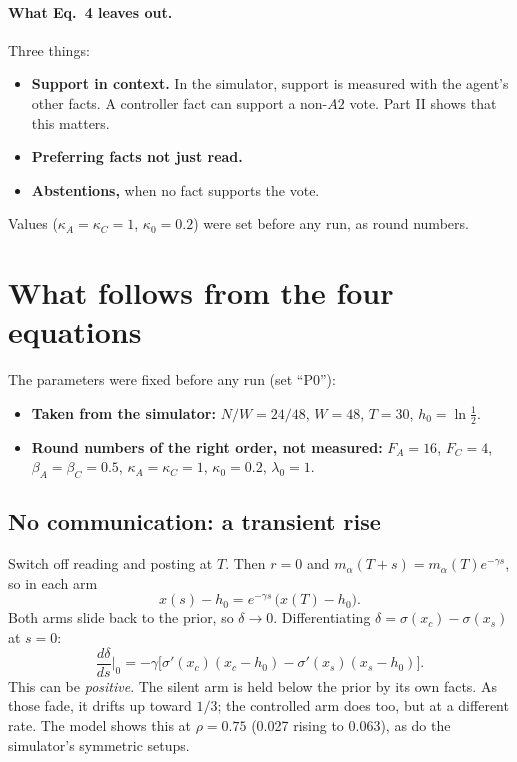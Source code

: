 \documentclass[10pt,a4paper]{article}
\begin{document}
\paragraph{What Eq.~4 leaves out.} Three things:
\begin{itemize}
\item \textbf{Support in context.} In the simulator, support is measured with the agent's other facts. A controller
  fact can support a non-$A2$ vote. Part II shows that this matters.
\item \textbf{Preferring facts not just read.}
\item \textbf{Abstentions,} when no fact supports the vote.
\end{itemize}
Values ($\kappa_A=\kappa_C=1$, $\kappa_0=0.2$) were set before any run, as round numbers.

\section{What follows from the four equations}
\label{sec:derived}
The parameters were fixed before any run (set ``P0''):
\begin{itemize}
\item \textbf{Taken from the simulator:} $N/W=24/48$, $W=48$, $T=30$, $h_0=\ln\frac12$.
\item \textbf{Round numbers of the right order, not measured:} $F_A=16$, $F_C=4$, $\beta_A=\beta_C=0.5$,
  $\kappa_A=\kappa_C=1$, $\kappa_0=0.2$, $\lambda_0=1$.
\end{itemize}

\subsection{No communication: a transient rise}
Switch off reading and posting at $T$. Then $r=0$ and $m_\alpha(T+s)=m_\alpha(T)e^{-\gamma s}$, so in each arm
\begin{equation}
x(s)-h_0=e^{-\gamma s}\,\big(x(T)-h_0\big).
\end{equation}
Both arms slide back to the prior, so $\delta\to0$. Differentiating $\delta=\sigma(x_c)-\sigma(x_s)$ at $s=0$:
\begin{equation}
\frac{d\delta}{ds}\Big|_{0}=-\gamma\Big[\sigma'(x_c)(x_c-h_0)-\sigma'(x_s)(x_s-h_0)\Big].
\end{equation}
This can be \emph{positive}. The silent arm is held below the prior by its own facts. As those fade, it drifts up toward
$1/3$; the controlled arm does too, but at a different rate. The model shows this at $\rho=0.75$ (0.027 rising to 0.063),
as do the simulator's symmetric setups.
\end{document}
